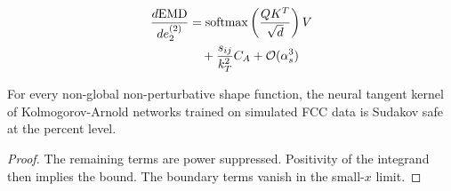 \begin{align}
  \frac{d \mathrm{EMD}}{d e_2^{(2)}} &= \mathrm{softmax}\left(\frac{Q K^T}{\sqrt{d}}\right) V \nonumber \\
  &\quad + \frac{s_{ij}}{k_T^2} C_A + \mathcal{O}(\alpha_s^3) \label{eq:5}
\end{align}

\begin{lemma}\label{thm:2}
For every non-global non-perturbative shape function, the neural tangent
kernel of Kolmogorov-Arnold networks trained on simulated FCC data is
Sudakov safe at the percent level.
\end{lemma}

\begin{proof}
The remaining terms are power suppressed. Positivity of the integrand
then implies the bound. The boundary terms vanish in the small-$x$
limit.
\end{proof}

